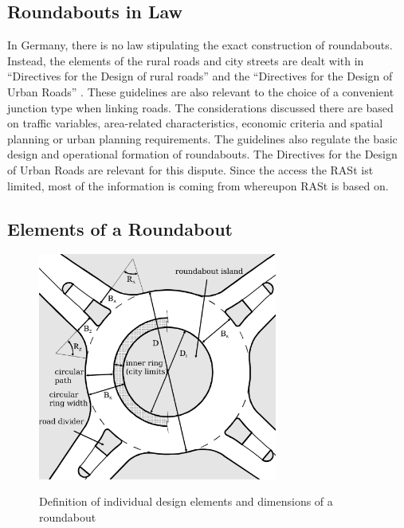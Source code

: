 \subsection{Roundabouts in Law}
%
In Germany, there is no law stipulating the exact construction of roundabouts.
Instead, the elements of the rural roads and city streets are dealt with in ``Directives for the Design of rural roads'' \cite{ral13}
and the ``Directives for the Design of Urban Roads''  \cite{rast06}. These guidelines are also relevant to the choice of a convenient junction type when linking roads.
The considerations discussed there are based on traffic variables, area-related characteristics, economic criteria and spatial planning or urban planning requirements. 
The guidelines also regulate the basic design and operational formation of roundabouts.
The  Directives for the Design of Urban Roads \cite{rast06} are relevant for this dispute. Since the access the RASt ist limited, most of the information is coming from
\cite{man06} whereupon RASt is based on.
\subsection{Elements of a Roundabout}

\begin{figure}[!ht]
\caption{Definition of individual design elements and dimensions of a roundabout \cite{man06}}
\includegraphics[width=0.7\textwidth]{bilder/kreisverkehr.png} %
\label{roundabout_parts}
\end{figure}



